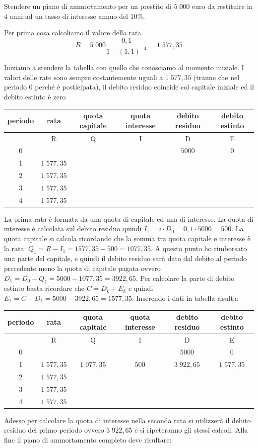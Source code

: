 \begin{exrig}
\begin{esempio}
Stendere un piano di ammortamento per un prestito di \(5\;000\) euro da 
restituire in \(4\) anni ad un tasso di interesse annuo del \(10\%\).

Per prima cosa calcoliamo il valore della rata
\[ R=5\;000\dfrac{0,1}{1-(1,1)^{-4}}=1\;577,35\]

Iniziamo a stendere la tabella con quello che conosciamo al momento 
iniziale.
I valori delle rate sono sempre costantemente uguali a \(1\;577,35\) (tranne 
che nel periodo 0 perché è posticipata), il debito residuo coincide col 
capitale iniziale ed il debito estinto è zero


\begin{tabular}{c|c|c|c|c|c}
\hline
    periodo & rata & quota capitale & quota interesse & debito residuo & 
debito estinto\\ \hline
	 & R & Q & I & D & E\\ \hline
	0 &  &  &  & \(5000\) & \(0\)\\
	1 & \(1\;577,35\) &  &  &  & \\
	2 & \(1\;577,35\) &  &  &  & \\
	3 & \(1\;577,35\) &  &  &  & \\
	4 & \(1\;577,35\) &  &  &  & \\
	\hline
\end{tabular}
La prima rata è formata da una quota di capitale ed una di interesse. La 
quota di interesse è calcolata sul debito residuo quindi \(I_1=i\cdot 
D_0=0,1\cdot 5000=500\). La quota capitale si calcola ricordando che la 
somma tra quota capitale e interesse è la rata: 
\(Q_1=R-I_1=1577,35-500=1077,35\). A questo punto ho rimborsato una parte del 
capitale, e quindi il debito residuo sarà dato dal debito al periodo 
precedente meno la quota di capitale pagata ovvero 
\(D_1=D_0-Q_1=5000-1077,35=3922,65\). Per calcolare la parte di debito estinto 
basta ricordare che \(C=D_k+E_k\) e quindi \(E_1=C-D_1=5000-3922,65=1577,35\).
Inserendo i dati in tabella risulta:

\begin{tabular}{c|c|c|c|c|c}
\hline
    periodo & rata & quota capitale & quota interesse & debito residuo & 
debito estinto\\ \hline
	 & R & Q & I & D & E\\ \hline
	0 &  &  &  & \(5000\) & \(0\)\\
	1 & \(1\;577,35\) & \(1\;077,35\) & \(500\) 
	  & \(3\;922,65\) & \(1\;577,35\)\\
	2 & \(1\;577,35\) &  &  &  & \\
	3 & \(1\;577,35\) &  &  &  & \\
	4 & \(1\;577,35\) &  &  &  & \\
	\hline
\end{tabular}
Adesso per calcolare la quota di interesse nella seconda rata si utilizzerà 
il debito residuo del primo periodo ovvero \(3\;922,65\) e si ripeteranno gli 
stessi calcoli. Alla fine il piano di ammortamento completo deve risultare:



\end{esempio}
\end{exrig}
